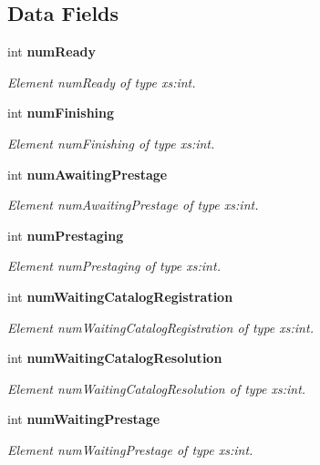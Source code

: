 \subsection*{Data Fields}
\begin{DoxyCompactItemize}
\item 
int {\bf numReady}
\begin{DoxyCompactList}\small\item\em Element numReady of type xs:int. \item\end{DoxyCompactList}\item 
int {\bf numFinishing}
\begin{DoxyCompactList}\small\item\em Element numFinishing of type xs:int. \item\end{DoxyCompactList}\item 
int {\bf numAwaitingPrestage}
\begin{DoxyCompactList}\small\item\em Element numAwaitingPrestage of type xs:int. \item\end{DoxyCompactList}\item 
int {\bf numPrestaging}
\begin{DoxyCompactList}\small\item\em Element numPrestaging of type xs:int. \item\end{DoxyCompactList}\item 
int {\bf numWaitingCatalogRegistration}
\begin{DoxyCompactList}\small\item\em Element numWaitingCatalogRegistration of type xs:int. \item\end{DoxyCompactList}\item 
int {\bf numWaitingCatalogResolution}
\begin{DoxyCompactList}\small\item\em Element numWaitingCatalogResolution of type xs:int. \item\end{DoxyCompactList}\item 
int {\bf numWaitingPrestage}
\begin{DoxyCompactList}\small\item\em Element numWaitingPrestage of type xs:int. \item\end{DoxyCompactList}\end{DoxyCompactItemize}


